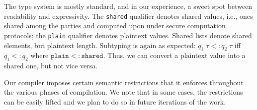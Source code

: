 \documentclass[sigconf, screen, natbib=false, dvipsnames, table]{acmart}
\theoremstyle{definition}
\begin{document}
The type system is mostly standard, and in our experience, a sweet spot between readability and expressivity.
The \texttt{shared} qualifier denotes shared values, i.e., ones shared among the parties and computed upon 
under secure computation protocols; the \texttt{plain} qualifier denotes plaintext values. Shared lists denote 
shared elements, but plaintext length. Subtyping is again as expected: $q_1 \; \tau <: q_2 \; \tau$ 
iff $q_1 <: q_2$ where $\texttt{plain} <: \texttt{shared}$. Thus, we can convert a plaintext value into a shared one, 
but not vice versa.

Our compiler imposes certain semantic restrictions that it enforces throughout the various 
phases of compilation. We note that in some cases, the restrictions 
can be easily lifted and we plan to do so in future iterations of the work. 
\end{document}
